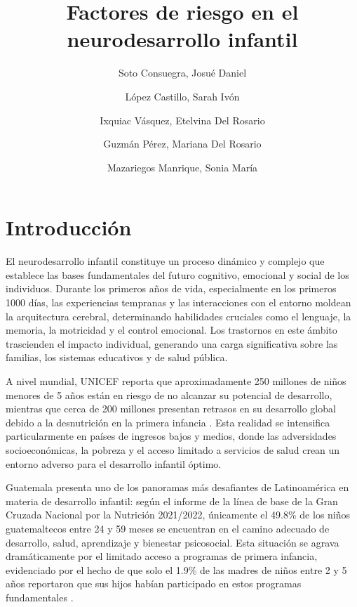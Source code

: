 \documentclass[11pt,letterpaper]{report}
\title{Factores de riesgo en el neurodesarrollo infantil}
\author{Soto Consuegra, Josué Daniel \and López Castillo, Sarah Ivón \and
Ixquiac Vásquez, Etelvina Del Rosario \and Guzmán Pérez, Mariana Del Rosario
\and Mazariegos Manrique, Sonia María}
\begin{document}
	\tableofcontents
\chapter{Introducción}
El neurodesarrollo infantil constituye un proceso dinámico y complejo que 
establece las bases fundamentales del futuro cognitivo, emocional y social de 
los individuos. Durante los primeros años de vida, especialmente en los 
primeros 1000 días, las experiencias tempranas y las interacciones con el 
entorno moldean la arquitectura cerebral, determinando habilidades cruciales 
como el lenguaje, la memoria, la motricidad y el control emocional. Los 
trastornos en este ámbito trascienden el impacto individual, generando una 
carga significativa sobre las familias, los sistemas educativos y de salud 
pública.

A nivel mundial, UNICEF reporta que aproximadamente 250 millones de niños
menores  de 5 años están en riesgo de no alcanzar su potencial de desarrollo,
mientras  que cerca de 200 millones presentan retrasos en su desarrollo global
debido a  la desnutrición en la primera infancia \cite{UNICEF2023}. Esta
realidad se  intensifica particularmente en países de ingresos bajos y medios,
donde las  adversidades socioeconómicas, la pobreza y el acceso limitado a
servicios de  salud crean un entorno adverso para el desarrollo infantil óptimo.

Guatemala presenta uno de los panoramas más desafiantes de Latinoamérica en
materia de desarrollo infantil: según el informe de la línea de base 
de la Gran Cruzada Nacional por la Nutrición 2021/2022, únicamente el 49.8\% 
de los niños guatemaltecos entre 24 y 59 meses se encuentran en el camino 
adecuado de desarrollo, salud, aprendizaje y bienestar psicosocial. Esta 
situación se agrava dramáticamente por el limitado acceso a programas de 
primera infancia, evidenciado por el hecho de que solo el 1.9\% de las madres 
de niños entre 2 y 5 años reportaron que sus hijos habían participado en estos 
programas fundamentales \cite{SESAN2022}.
\end{document}
